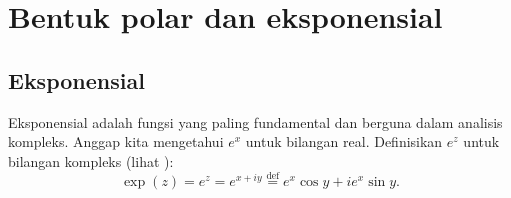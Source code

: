 
\section{Bentuk polar dan eksponensial}

\subsection{Eksponensial} \label{subsection:firstdefexp}

Eksponensial adalah fungsi yang paling fundamental dan berguna dalam analisis
kompleks.
Anggap kita mengetahui $e^x$ untuk bilangan real.
Definisikan $e^z$ untuk bilangan kompleks (lihat
):
%
\begin{equation*}
\exp(z) =
e^{z} = 
e^{x+iy}
\overset{\text{def}}{=}
e^x\cos y + i e^x \sin y .
\end{equation*}
